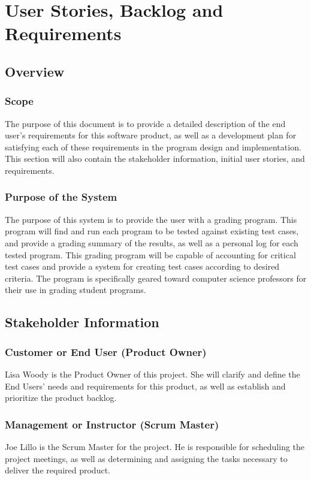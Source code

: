 \chapter{User Stories, Backlog and Requirements}
\section{Overview}

\subsection{Scope}
The purpose of this document is to provide a detailed description of the end user's requirements
for this software product, as well as a development plan for satisfying each of these requirements
in the program design and implementation.  This section will also contain the stakeholder information, 
initial user stories, and requirements. 

\subsection{Purpose of the System}
The purpose of this system is to provide the user with a grading program.  This program will find and run each program to be tested against existing test cases, and provide a grading summary of the results, as well as a personal log for each tested program.  This grading program will be capable of accounting for critical test cases and provide a system for creating test cases according to desired criteria. The program is specifically geared toward computer science professors for their use in 
grading student programs.


\section{ Stakeholder Information}

\subsection{Customer or End User (Product Owner)}
Lisa Woody is the Product Owner of this project.  She will clarify and define the End Users' needs and requirements 
for this product, as well as establish and prioritize the product backlog.

\subsection{Management or Instructor (Scrum Master)}
Joe Lillo is the Scrum Master for the project.  He is responsible for scheduling the project meetings, as well as 
determining and assigning the tasks necessary to deliver the required product.

